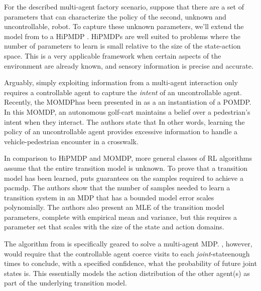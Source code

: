    For the described multi-agent factory scenario, suppose that there are a set of parameters that can characterize the
    policy of the second, unknown and uncontrollable, robot. To capture these unknown parameters, we'll extend the model
    from  to a \ac{HiPMDP}    \cite{doshi2016hidden}. \ac{HiPMDP}s are well suited to problems where the number
    of parameters to learn is small relative to the size of the state-action space. This is a very applicable framework
    when certain aspects of the environment are already known, and sensory information is precise and accurate.

    Arguably, simply exploiting information from a multi-agent interaction only requires a controllable agent to capture
    the \textit{intent} of an uncontrollable agent.  Recently, the \ac{MOMDP}has been presented in
    \cite{bandyopadhyay2013intention} as a an instantiation of a \ac{POMDP}\cite{kaelbling1998planning}. In this
    \ac{MOMDP}, an autonomous golf-cart maintains a belief over a pedestrian's intent when they interact. The authors
    state that  In other words, learning the policy of an uncontrollable agent provides excessive information to handle
    a vehicle-pedestrian encounter in a crosswalk.


    In comparison to \ac{HiPMDP} and \ac{MOMDP}, more general classes of \ac{RL} algorithms assume that the entire
    transition model is unknown. To prove that a transition model has been learned,  \cite{Fu-RSS-14} puts guarantees on
    the samples required to achieve a \ac{pacmdp}. The authors show that the number of samples needed to learn a
    transition system in an \ac{MDP} that has a bounded model error scales polynomially.  The authors also present an
    \ac{MLE} of the transition model parameters, complete with empirical mean and variance, but this requires a
    parameter set that scales with the size of the state and action domains.

    The \Rmax algorithm from \cite{brafman2002r} is specifically geared to solve a multi-agent \ac{MDP}. \Rmax, however,
    would require that the controllable agent coerce visits to each \textit{joint}-state\footnotemark enough times to
    conclude, with a specified confidence, what the probability of future joint states is. This essentially models the
    action distribution of the other agent(s) as part of the underlying transition model.  

